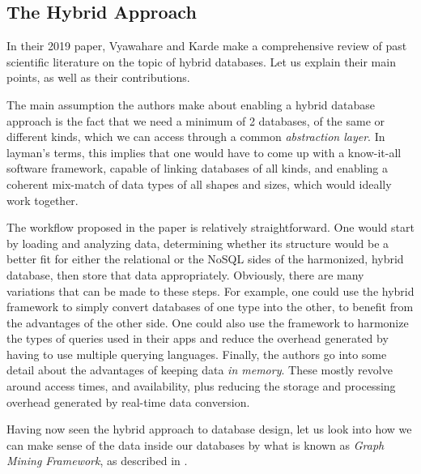 \documentclass[10pt,        %
               a4paper,     %
               journal,     %
               ]{IEEEtran}
\begin{document}
\subsection{The Hybrid Approach}
In their 2019 paper, Vyawahare and Karde \cite{IEEEpaper3:hybrid} make a comprehensive review of past scientific literature on the topic of hybrid databases. Let us explain their main points, as well as their contributions. \par
The main assumption the authors make about enabling a hybrid database approach is the fact that we need a minimum of 2 databases, of the same or different kinds, which we can access through a common \textit{abstraction layer}. In layman's terms, this implies that one would have to come up with a know-it-all software framework, capable of linking databases of all kinds, and enabling a coherent mix-match of data types of all shapes and sizes, which would ideally work together. \par
The workflow proposed in the paper is relatively straightforward. One would start by loading and analyzing data, determining whether its structure would be a better fit for either the relational or the NoSQL sides of the harmonized, hybrid database, then store that data appropriately. Obviously, there are many variations that can be made to these steps. For example, one could use the hybrid framework to simply convert databases of one type into the other, to benefit from the advantages of the other side. One could also use the framework to harmonize the types of queries used in their apps and reduce the overhead generated by having to use multiple querying languages. Finally, the authors go into some detail about the advantages of keeping data \textit{in memory}. These mostly revolve around access times, and availability, plus reducing the storage and processing overhead generated by real-time data conversion. \par
Having now seen the hybrid approach to database design, let us look into how we can make sense of the data inside our databases by what is known as \textit{Graph Mining Framework}, as described in \cite{IEEEpaper2:mining}.
\end{document}
